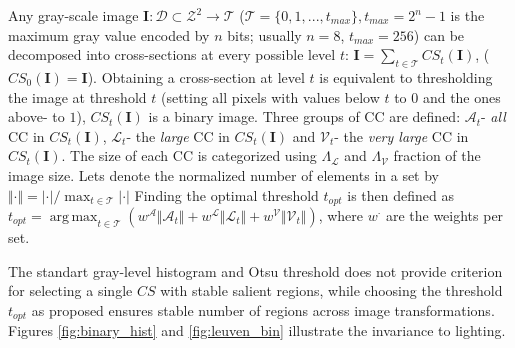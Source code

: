 \documentclass{article}
\def\I{{\mathbf I}}
\def\mcT{{\mathcal{T}}}
\def\mcD{{\mathcal{D}}}
\def\mcA{{\mathcal{A}}}
\def\mcL{{\mathcal{L}}}
\def\mcV{{\mathcal{V}}}
\DeclareMathOperator*{\argmax}{arg\,max}
\begin{document}
Any gray-scale image  $\I: \mcD \subset \mathcal{Z}^2 \rightarrow \mcT $ ($\mcT = \{0,1, ..., t_{max}\}, t_{max} = 2^n-1$ is the maximum
gray value encoded by $n$ bits; usually $n=8$, $t_{max} = 256$) can be decomposed into cross-sections at
every possible level $t$:  $\I = \sum_{t \in \mcT}CS_t(\I)$, 
($CS_0(\I) = \I$). Obtaining a cross-section at level $t$ is equivalent to thresholding the image at threshold $t$ (setting all pixels with values below $t$ to $0$ and the ones above- to $1$), $CS_t(\I)$ is a binary image. 
Three groups of CC are defined: $\mcA_t$- {\em all} CC in $CS_t(\I)$, $\mcL_t$- the {\em large} CC in $CS_t(\I)$ and 
$\mcV_t$- the {\em very large} CC in $CS_t(\I)$.  The size of each CC is categorized using $\Lambda_{\mcL}$ and $\Lambda_{\mcV}$ fraction of the image size. Lets denote the normalized number of elements in a set by $\Vert \cdot \Vert = |\cdot| / \max_{t \in \mcT}|\cdot|$
Finding the optimal threshold $t_{opt}$ is then defined as
$t_{opt} = \argmax_{t \in \mcT}( w^{\mcA} \Vert \mcA_t \Vert + w^{\mcL} \Vert \mcL_t \Vert + w^{\mcV} \Vert \mcV_t \Vert )$,
where $w^{\cdot}$ are the weights per set.  

The standart gray-level histogram and Otsu threshold does not provide criterion for selecting a single $CS$ with stable salient regions, while choosing the threshold $t_{opt}$ as proposed  ensures stable number of regions across image transformations. Figures \ref{fig:binary_hist} and \ref{fig:leuven_bin} illustrate the invariance to lighting.
 
\end{document}
